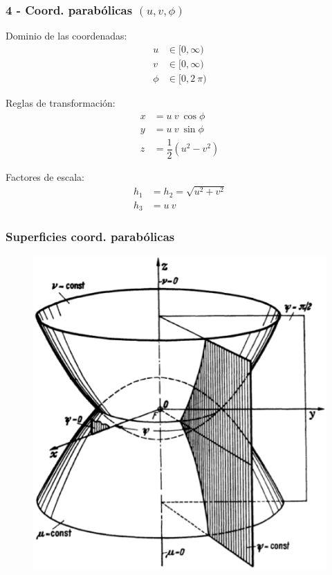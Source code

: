 \documentclass[12pt]{beamer}
\begin{document}
\begin{frame}
\frametitle{4 - Coord. parabólicas $(u, v, \phi)$}
\fontsize{12}{12}\selectfont
\begin{minipage}{0.45\textwidth}
Dominio de las coordenadas:
\pause
\begin{align*}
u &\in [0, \infty) \\
v &\in [0, \infty) \\
\phi &\in [0, 2 \: \pi)
\end{align*}
\end{minipage}
\hspace{1cm}
\pause
\begin{minipage}{0.4\textwidth}
Reglas de transformación:
\pause
\begin{align*}
x &= u \: v \: \cos \phi \\
y &= u \: v \: \sin \phi \\
z &= \dfrac{1}{2} (u^{2} - v^{2})
\end{align*}
\end{minipage}

Factores de escala:
\pause
\begin{align*}
h_{1} &= h_{2} = \sqrt{u^{2 } +v^{2}} \\
h_{3} &= u \: v
\end{align*}
\end{frame}
\begin{frame}
\frametitle{Superficies coord. parabólicas}
\begin{figure}[H]
\centering
\includegraphics[scale=0.3]{Imagenes/Sistema_Parabolico.eps}
\end{figure}
\end{frame}
\end{document}

